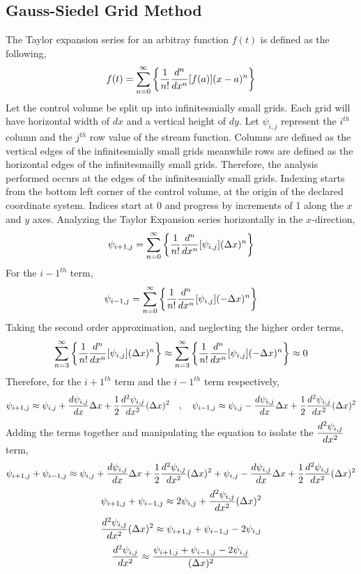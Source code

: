 \documentclass[a4paper, 12pt]{report}
\begin{document}
\begin{center}
\subsection{Gauss-Siedel Grid Method}
\begin{comment}
\end{comment}
The Taylor expansion series for an arbitray function $f(t)$ is defined as the following,
$$f(t) = \sum^{\infty}_{n = 0}\left\{\frac{1}{n!}\frac{d^n}{dx^n}[f(a)](x - a)^n\right\}$$
Let the control volume be split up into infinitesmially small grids. Each grid will have horizontal width of $dx$ and a vertical height of $dy$. Let $\psi_{i,j}$ represent the $i^{th}$ column and the $j^{th}$ row value of the stream function. Columns are defined as the vertical edges of the infinitesmially small grids meanwhile rows are defined as the horizontal edges of the infinitesmailly small grids. Therefore, the analysis performed occurs at the edges of the infinitesmially small grids. Indexing starts from the bottom left corner of the control volume, at the origin of the declared coordinate system. Indices start at 0 and progress by increments of 1 along the $x$ and $y$ axes. Analyzing the Taylor Expansion series horizontally in the $x$-direction,
$$\psi_{i + 1,j} = \sum^{\infty}_{n = 0}\left\{\frac{1}{n!}\frac{d^n}{dx^n}[\psi_{i,j}](\Delta x)^n\right\}$$
For the ${i - 1}^{th}$ term,
$$\psi_{i - 1,j} = \sum^{\infty}_{n = 0}\left\{\frac{1}{n!}\frac{d^n}{dx^n}[\psi_{i,j}](-\Delta x)^n\right\}$$
Taking the second order approximation, and neglecting the higher order terms,
$$\sum^{\infty}_{n = 3}\left\{\frac{1}{n!}\frac{d^n}{dx^n}[\psi_{i,j}](\Delta x)^n\right\}\approx \sum^{\infty}_{n = 3}\left\{\frac{1}{n!}\frac{d^n}{dx^n}[\psi_{i,j}](-\Delta x)^n\right\}\approx 0$$
Therefore, for the ${i + 1}^{th}$ term and the ${i - 1}^{th}$ term respectively,
$$\psi_{i + 1,j} \approx \psi_{i,j} + \frac{d\psi_{i,j}}{dx}\Delta x + \frac{1}{2}\frac{d^2\psi_{i,j}}{dx^2}(\Delta x)^2 \quad,\quad \psi_{i - 1,j} \approx \psi_{i,j} - \frac{d\psi_{i,j}}{dx}\Delta x + \frac{1}{2}\frac{d^2\psi_{i,j}}{dx^2}(\Delta x)^2$$
Adding the terms together and manipulating the equation to isolate the $\displaystyle{\frac{d^2\psi_{i,j}}{dx^2}}$ term,
$$\psi_{i + 1,j} + \psi_{i - 1,j} \approx \psi_{i,j} + \frac{d\psi_{i,j}}{dx}\Delta x + \frac{1}{2}\frac{d^2\psi_{i,j}}{dx^2}(\Delta x)^2 + \psi_{i,j} - \frac{d\psi_{i,j}}{dx}\Delta x + \frac{1}{2}\frac{d^2\psi_{i,j}}{dx^2}(\Delta x)^2$$
$$\psi_{i + 1,j} + \psi_{i - 1,j} \approx 2\psi_{i,j} + \frac{d^2\psi_{i,j}}{dx^2}(\Delta x)^2$$
$$\frac{d^2\psi_{i,j}}{dx^2}(\Delta x)^2\approx \psi_{i + 1,j} + \psi_{i - 1,j} - 2\psi_{i,j}$$
$$\frac{d^2\psi_{i,j}}{dx^2} \approx \frac{\psi_{i + 1,j} + \psi_{i - 1,j} - 2\psi_{i,j}}{(\Delta x)^2}$$

\end{center}
\end{document}

